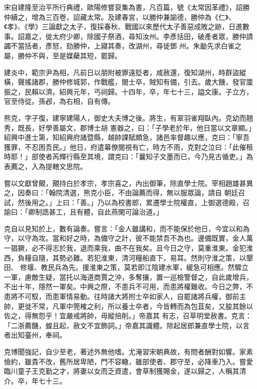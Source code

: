 \begin{pinyinscope}
 宋自建隆至治平所行典禮，歐陽修嘗裒集為書，凡百篇，號《太常因革禮》，詔勝仲續之，增為三百卷，詔藏太常。及建春宮，以勝仲兼諭德，勝仲為《仁》、《孝》、《學》三論獻之太子，復採春秋、戰國以來歷代太子善惡成敗之跡，日進數事。詔嘉之，徙太府少卿，除國子祭酒，尋知汝州。李彥括田，破產者眾，勝仲請蠲不當括者，彥怒，劾勝仲，上寢其奏，改湖州，尋徙鄧
 州。朱勔先求白雀之屬，勝仲不與，至是媒蘗其短，罷歸。



 建炎中，範宗尹為相，凡前日以朋附被罪遠貶者，咸赦還，復知湖州，時群盜縱橫，聲搖諸郡，勝仲修城郭，作戰艦，閱士卒，賊知有備，引去。歲大饑，發官廩振之，民賴以濟。紹興元年，丐祠歸。十四年，卒，年七十三，謚文康。子立方，官至侍從。孫邲，為右相，自有傳。



 熊克，字子復，建寧建陽人，御史大夫博之後。將生，有翠羽雀翔臥內。克幼而翹秀，既長，好學善屬文，郡博士胡
 憲器之，曰：「子學老於年，他日當以文章顯。」紹興中進士第，知紹興府諸暨縣，越帥課賦頗急，諸邑率督趣以應，克曰：「寧吾獲罪，不忍困吾民。」他日，府遣幕僚閱視有亡，時方不雨，克對之泣曰：「此催租時耶！」部使者芮輝行縣至其境，謂克曰：「曩知子文墨而已，今乃見古循吏。」為表薦之，入為提轄文思院。



 嘗以文獻曾覿，覿持白於孝宗，孝宗喜之，內出御筆，除直學士院。宰相趙雄甚異之，因奏曰：「翰院清選，熊克小臣，不由論薦而得，無以服眾論，請自
 朝廷召試，然後用之。」上曰：「善。」乃以為校書郎，累遷學士院權直，上御選德殿，召諭曰：「卿制誥甚工，且有體，自此燕閑可論治道。」



 克自以見知於上，數有論奏。嘗言：「金人雖講和，而不能保於他日，今宜以和為守，以守為攻。當和好之時，為備守之計，彼不能禁吾不為也。邊備既實，金人萬一猖獗，必不得志於我，退而乘我，曲不在我矣。且今日之守，莫重淮東。金犯淮西，負糧自隨，其勢必難。若犯淮東，清河糧船直下，易耳。然則守淮之策，以墾田、
 修堰、教民兵為先。援淮東之策，莫若即江陰建水軍，緩急可相應。然驟立一軍，慮敵生疑，當托以海道商賈之沖，多奪攘，置一巡檢警督之，自此歲增兵，不出十年，隱然一軍矣。中興之際，不患兵不可用，而患將權難收。今日之弊，不患將不可馭，而患軍情易動。往時諸大將拊士卒如家人，自罷諸將兵權，御前主帥，更徙不常，凡軍中筦榷之利，所以養士卒者，今皆轉而為包苴矣，又朘其餘以佐之，得無怨乎！宜嚴戒將帥，毋縱掊削。」帝嘉其
 有志，召草明堂赦書。克言：「二浙薦饑，蝗且起，赦文不宜飾詞。」帝嘉其識體。除起居郎兼直學士院，以言者出知臺州，奉祠。



 克博聞強記，自少至老，著述外無他嗜。尤淹習宋朝典故，有問者酬對如響。家素儉約，雖貴不改，舊所居卑陋，門不容轍，雖部使者、郡守至，必降車乃入。嘗愛臨川童子王克勤之才，將妻以女而乏資遣，會草制獲賜金，遂以歸之，人稱其清介。卒，年七十三。




\end{pinyinscope}
